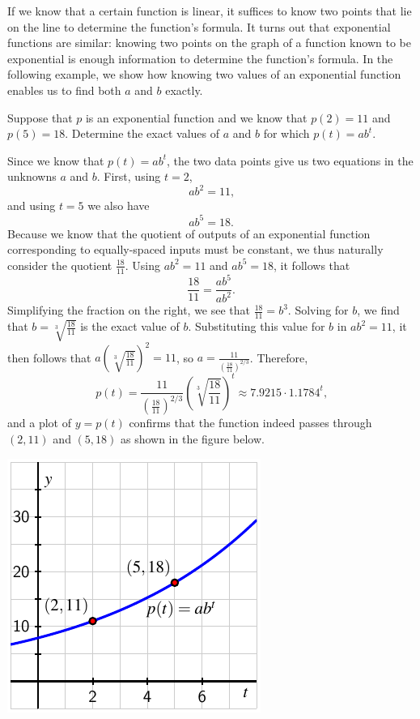 \documentclass[nooutcomes]{ximera}
\begin{document}
If we know that a certain function is linear, it suffices to know two points that lie on the line to determine the function's formula.  It turns out that exponential functions are similar:  knowing two points on the graph of a function known to be exponential is enough information to determine the function's formula.  In the following example, we show how knowing two values of an exponential function enables us to find both $a$ and $b$ exactly.

\begin{example}\label{example:exp1}
Suppose that $p$ is an exponential function and we know that $p(2) = 11$ and $p(5) = 18$.  Determine the exact values of $a$ and $b$ for which $p(t) = ab^t$.
\begin{explanation}
Since we know that $p(t) = ab^t$, the two data points give us two equations in the unknowns $a$ and $b$.  First, using $t = 2$,%
\begin{equation}
ab^2 = 11\text{,}
\end{equation}
and using $t = 5$ we also have%
\begin{equation}
ab^5 = 18\text{.}
\end{equation}
Because we know that the quotient of outputs of an exponential function corresponding to equally-spaced inputs must be constant, we thus naturally consider the quotient $\frac{18}{11}$.  Using $ab^2 = 11$ and $ab^5 = 18$, it follows that%
\begin{equation*}
\frac{18}{11} = \frac{ab^5}{ab^2}\text{.}
\end{equation*}
Simplifying the fraction on the right, we see that $\frac{18}{11} = b^3$. Solving for $b$, we find that $b = \sqrt[3]{\frac{18}{11}}$ is the exact value of $b$.  Substituting this value for $b$ in $ab^2 = 11$, it then follows that $a \left( \sqrt[3]{\frac{18}{11}} \right)^2 = 11$, so $a = \frac{11}{\left( \frac{18}{11} \right)^{2/3}}$.  Therefore,%
\begin{equation*}
p(t) = \frac{11}{\left( \frac{18}{11} \right)^{2/3}} \left( \sqrt[3]{\frac{18}{11}} \right)^t \approx 7.9215 \cdot 1.1784^t\text{,}
\end{equation*}
and a plot of $y = p(t)$ confirms that the function indeed passes through $(2,11)$ and $(5,18)$ as shown in the figure below.

\begin{image}
\includegraphics{growth-find-a-b}
\end{image}


\end{explanation}
\end{example}
\end{document}
